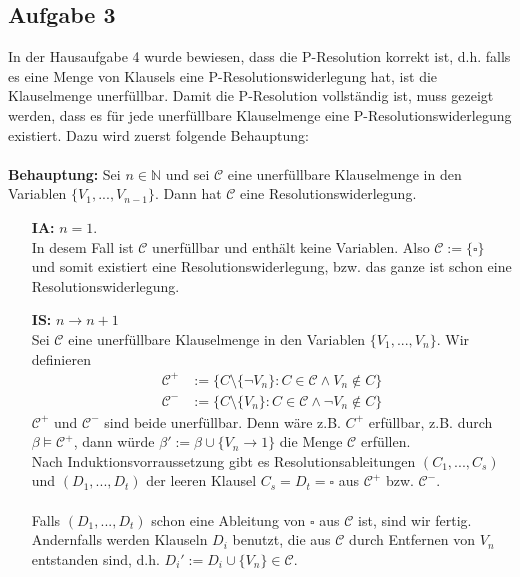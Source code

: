 \documentclass[a4paper,10pt]{article}
\begin{document}
\subsection*{Aufgabe 3}
In der Hausaufgabe 4 wurde bewiesen, dass die P-Resolution korrekt ist, d.h. falls es eine Menge von Klausels eine P-Resolutionswiderlegung hat, ist die Klauselmenge unerfüllbar. Damit die P-Resolution vollständig ist, muss gezeigt werden, dass  es für jede unerfüllbare Klauselmenge eine P-Resolutionswiderlegung existiert. Dazu wird zuerst folgende Behauptung: \\
\ \\
\textbf{Behauptung: } Sei $n \in \mathbb{N}$ und sei $\mathcal{C}$ eine unerfüllbare Klauselmenge in den Variablen $\{V_1,...,V_{n-1} \}$. Dann hat $\mathcal{C}$ eine Resolutionswiderlegung. 
\begin{itemize}
	\item[\textbf{IA:}] $n=1$. \\
		In desem Fall ist $\mathcal{C}$ unerfüllbar und enthält keine Variablen. Also $\mathcal{C} := \{ \square \}$ und somit existiert eine Resolutionswiderlegung, bzw. das ganze ist schon eine Resolutionswiderlegung.
	\item[\textbf{IS:}] $n \rightarrow n+1$ \\
		Sei $\mathcal{C}$ eine unerfüllbare Klauselmenge in den Variablen $\{V_1,...,V_n \}$. Wir definieren
		\begin{align*}
			\mathcal{C}^+ &:= \{C \setminus \{ \lnot V_n  \}: C \in \mathcal{C} \land V_n \not \in C \} \\
			\mathcal{C}^- &:= \{C \setminus \{V_n  \}: C \in \mathcal{C} \land \lnot V_n \not \in C \}
		\end{align*}
		$\mathcal{C}^+$ und $\mathcal{C}^-$ sind beide unerfüllbar. Denn wäre z.B. $C^+$ erfüllbar, z.B. durch $\beta \vDash \mathcal{C}^+$, dann würde $\beta' := \beta \cup \{V_n \rightarrow 1 \}$ die Menge $\mathcal{C}$ erfüllen. \\
		Nach Induktionsvorraussetzung gibt es Resolutionsableitungen $(C_1,...,C_s)$ und $(D_1,...,D_t)$ der leeren Klausel $C_s = D_t = \square$ aus $\mathcal{C}^+$ bzw. $\mathcal{C}^-$. \\
		 \ \\
		Falls  $(D_1,...,D_t)$  schon eine Ableitung von $\square$ aus $\mathcal{C}$ ist, sind wir fertig. Andernfalls werden Klauseln $D_i$ benutzt, die aus $\mathcal{C}$ durch Entfernen von $V_n$ entstanden sind, d.h. $D_i' := D_i \cup \{V_n \} \in \mathcal{C}$. \\

\end{itemize}
\end{document}

